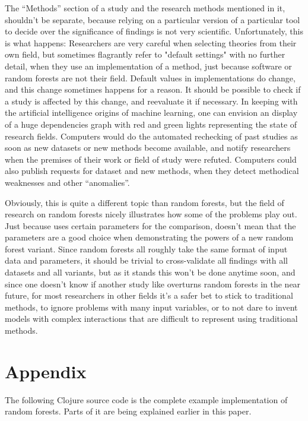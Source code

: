 \documentclass[a4paper,man,12pt,apacite,floatsintext,draftfirst]{apa6} %
\begin{document}
The “Methods” section of a study and the research methods mentioned in it,
shouldn't be separate, because relying on a particular version of a particular
tool to decide over the significance of findings is not very scientific.
Unfortunately, this is what happens:
Researchers are very careful when selecting theories from their own field,
but sometimes flagrantly refer to "default settings" with no further detail,
when they use an implementation of a method,
just because software or random forests are not their field.
Default values in implementations do change, and this change sometimes
happens for a reason.
It should be possible to check if a study is affected by this change,
and reevaluate it if necessary.
In keeping with the artificial intelligence origins of machine learning,
one can envision an display of a huge dependencies graph with
red and green lights representing the state of research fields.
Computers would do the automated rechecking of past studies as soon as
new datasets or new methods become available, and notify researchers
when the premises of their work or field of study were refuted.
Computers could also publish requests for dataset and new methods,
when they detect methodical weaknesses and other “anomalies”.

Obviously, this is quite a different topic than random forests, but the
field of research on random forests nicely illustrates how some of the
problems play out.
Just because \cite{breiman2001random} uses certain parameters for the
comparison, doesn't mean that the parameters are a good choice when
demonstrating the powers of a new random forest variant.
Since random forests all roughly take the same format of input data and
parameters, it should be trivial to cross-validate all findings with all
datasets and all variants, but as it stands this won't be done anytime soon,
and since one doesn't know if another study like \cite{banfield2007comparison}
overturns random forests in the near future, for most researchers in other
fields it's a safer bet to stick to traditional methods,
to ignore problems with many input variables, or to not dare to invent
models with complex interactions that are difficult to represent using
traditional methods.

\newpage
\section{Appendix}
The following Clojure source code is the complete example implementation
of random forests. Parts of it are being explained earlier in this paper.
\end{document}
